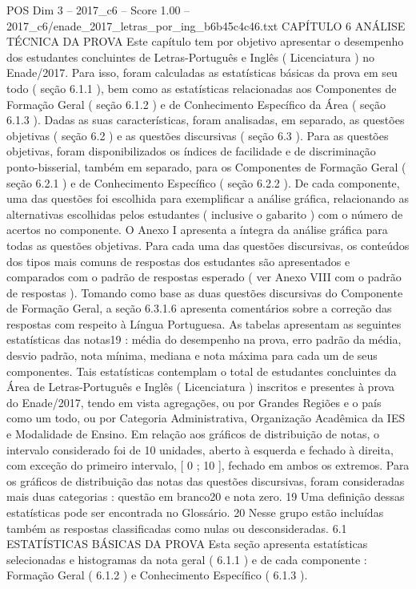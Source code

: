 \begin{textsample}{POS Dim 3 – 2017\_c6 – Score 1.00 – 2017\_c6/enade\_2017\_letras\_por\_ing\_b6b45c4c46.txt}  \label{ex:f3_pos_198}
CAPÍTULO 6 ANÁLISE TÉCNICA DA PROVA Este capítulo tem por objetivo apresentar o desempenho dos estudantes concluintes de Letras-Português e Inglês ( Licenciatura ) no Enade/2017.
Para isso, foram calculadas as estatísticas básicas da prova em seu todo ( seção 6.1.1 ), bem como as estatísticas relacionadas aos Componentes de Formação Geral ( seção 6.1.2 ) e de Conhecimento Específico da Área ( seção 6.1.3 ).
Dadas as suas características, foram analisadas, em separado, as questões objetivas ( seção 6.2 ) e as questões discursivas ( seção 6.3 ).
Para as questões objetivas, foram disponibilizados os índices de facilidade e de discriminação ponto-bisserial, também em separado, para os Componentes de Formação Geral ( seção 6.2.1 ) e de Conhecimento Específico ( seção 6.2.2 ).
De cada componente, uma das questões foi escolhida para exemplificar a análise gráfica, relacionando as alternativas escolhidas pelos estudantes ( inclusive o gabarito ) com o número de acertos no componente.
O Anexo I apresenta a íntegra da análise gráfica para todas as questões objetivas.
Para cada uma das questões discursivas, os conteúdos dos tipos mais comuns de respostas dos estudantes são apresentados e comparados com o padrão de respostas esperado ( ver Anexo VIII com o padrão de respostas ).
Tomando como base as duas questões discursivas do Componente de Formação Geral, a seção 6.3.1.6 apresenta comentários sobre a correção das respostas com respeito à Língua Portuguesa.
As tabelas apresentam as seguintes estatísticas das notas19 : média do desempenho na prova, erro padrão da média, desvio padrão, nota mínima, mediana e nota máxima para cada um de seus componentes.
Tais estatísticas contemplam o total de estudantes concluintes da Área de Letras-Português e Inglês ( Licenciatura ) inscritos e presentes à prova do Enade/2017, tendo em vista agregações, ou por Grandes Regiões e o país como um todo, ou por Categoria Administrativa, Organização Acadêmica da IES e Modalidade de Ensino.
Em relação aos gráficos de distribuição de notas, o intervalo considerado foi de 10 unidades, aberto à esquerda e fechado à direita, com exceção do primeiro intervalo, [ 0 ; 10 ], fechado em ambos os extremos.
Para os gráficos de distribuição das notas das questões discursivas, foram consideradas mais duas categorias : questão em branco20 e nota zero. 19 Uma definição dessas estatísticas pode ser encontrada no Glossário. 20 Nesse grupo estão incluídas também as respostas classificadas como nulas ou desconsideradas. 6.1 ESTATÍSTICAS BÁSICAS DA PROVA Esta seção apresenta estatísticas selecionadas e histogramas da nota geral ( 6.1.1 ) e de cada componente : Formação Geral ( 6.1.2 ) e Conhecimento Específico ( 6.1.3 ).

\end{textsample}
